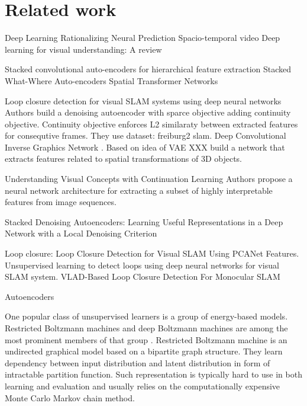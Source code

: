 
\chapter{Related work}
Deep Learning \cite{LeCun2015}
Rationalizing Neural Prediction \cite{Lei2016}
Spacio-temporal video \cite{Patraucean2016}
Deep learning for visual understanding: A review \cite{Guo2016}

Stacked convolutional auto-encoders for hierarchical feature extraction \cite{Masci2011}
Stacked What-Where Auto-encoders \cite{Zhao2015}
Spatial Transformer Networks \cite{Jaderberg2015}

Loop closure detection for visual SLAM systems using deep neural networks \cite{Gao2015}
Authors build a denoising autoencoder with sparce objective adding continuity objective.
Continuity objective enforces L2 similaraty between extracted features for consequtive frames. They use dataset: freiburg2 slam.
Deep Convolutional Inverse Graphics Network \cite{Kulkarni2015}.
Based on idea of VAE XXX build a network that extracts features related to spatial transformations of 3D objects.

Understanding Visual Concepts with Continuation Learning \cite{Whitney2016}
Authors propose a neural network architecture for extracting a subset of highly interpretable features
from image sequences.

Stacked Denoising Autoencoders: Learning Useful Representations in a Deep Network with a Local Denoising Criterion \cite{Vincent2010}

Loop closure:
Loop Closure Detection for Visual SLAM Using PCANet Features.
Unsupervised learning to detect loops using deep neural networks for visual SLAM system.
VLAD-Based Loop Closure Detection For Monocular SLAM \cite{Xia2016, Gao2015a, Huang2016}


Autoencoders


One popular class of unsupervised learners is a group of energy-based models.
Restricted Boltzmann machines and deep Boltzmann machines are among the most prominent members of that group \cite{Ackley1985, Salakhutdinov2009}.
Restricted Boltzmann machine is an undirected graphical model based on a bipartite graph structure.
They learn dependency between input distribution and latent distribution in form of intractable partition function.
Such representation is typically hard to use in both learning and evaluation and usually relies on the computationally expensive Monte Carlo Markov chain method.


